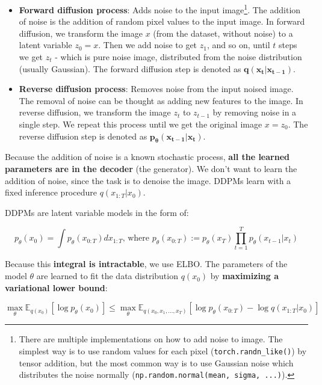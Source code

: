 \begin{itemize}
    \item \textbf{Forward diffusion process}: Adds noise to the input image\footnote{There are multiple implementations on how to add noise to image. The simplest way is to use random values for each pixel (\texttt{torch.randn\_like()}) by tensor addition, but the most common way is to use Gaussian noise which distributes the noise normally (\texttt{np.random.normal(mean, sigma, ...)}).}. The addition of noise is the addition of random pixel values to the input image. In forward diffusion, we transform the image $x$ (from the dataset, without noise) to a latent variable $z_0 = x$. Then we add noise to get $z_1$, and so on, until $t$ steps we get $z_t$ - which is pure noise image, distributed from the noise distribution (usually Gaussian). The forward diffusion step is denoted as $\mathbf{q(x_t | x_{t-1})}$.
    
    \item \textbf{Reverse diffusion process}: Removes noise from the input noised image. The removal of noise can be thought as adding new features to the image. In reverse diffusion, we transform the image $z_t$ to $z_{t-1}$ by removing noise in a single step. We repeat this process until we get the original image $x = z_0$. The reverse diffusion step is denoted as $\mathbf{p_\theta (x_{t-1} | x_t)}$.
\end{itemize}

Because the addition of noise is a known stochastic process, \textbf{all the learned parameters are in the decoder} (the generator). We don't want to learn the addition of noise, since the task is to denoise the image. DDPMs learn with a fixed inference procedure $q(x_{1:T} | x_0)$.

DDPMs are latent variable models in the form of:

\begin{equation*}
    p_\theta (x_0) = \int p_\theta(x_{0:T}) dx_{1:T} \text{,\ \ where \ \ \ } p_\theta (x_{0:T}) := p_\theta (x_T) \prod_{t=1}^{T} p_\theta (x_{t-1} | x_t)
\end{equation*}

Because this \textbf{integral is intractable}, we use ELBO. The parameters of the model $\theta$ are learned to fit the data distribution $q(x_0)$ by \textbf{maximizing a variational lower bound}:

\begin{equation*}
    \max_{\theta} \mathbb{E}_{q(x_0)} [\log p_\theta (x_0)] \leq \max_\theta \mathbb{E}_{q(x_0, x_1, ..., x_T)} [\log p_\theta (x_{0:T}) - \log q(x_{1:T} | x_0)]
\end{equation*}

